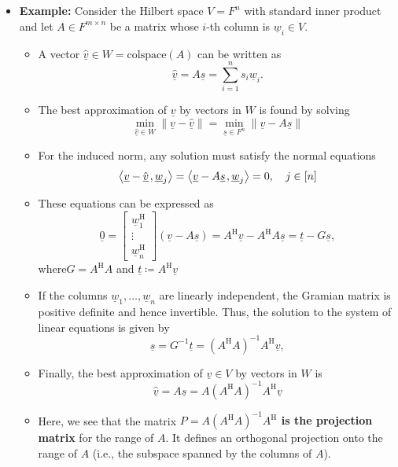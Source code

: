 \documentclass[11pt,twoside]{report}
\newcommand{\vecnot}{\underline}
\newcommand{\Herm}{{\mathrm{H}}}
\newcommand{\inner}[2]{{\left\langle #1 \mskip2mu , #2 \right\rangle}}
\begin{document}
\begin{itemize}
 
\item \textbf{Example:} Consider the Hilbert space $V = F^n$ with standard inner product and let  $A \in F^{m \times n}$ be a matrix whose $i$-th column is $\vecnot{w}_i \in V$.

\begin{itemize}
\item 
A vector  $\hat{\vecnot{v}} \in W = \text{colspace}(A)$ can be written as 
\[ \hat{\vecnot{v}} = A \vecnot{s} = \sum_{i=1}^n s_i \vecnot{w}_i.
\]

\item The best approximation of $\vecnot{v}$ by vectors in $W$ is found by solving
\[ \min_{\hat{\vecnot{v}}\in W} \| \vecnot{v} - \hat{ \vecnot{v}} \| = \min_{\vecnot{s} \in F^n} \| \vecnot{v} - A \vecnot{s} \|  \]

\item 
For the induced norm, any solution must satisfy the normal equations
\[ \inner{ \vecnot{v} - \hat{\vecnot{v}} }{ \vecnot{w}_j }
= \inner{ \vecnot{v} - A \vecnot{s} }{ \vecnot{w}_j }
= 0, \quad j \in [n]
\]



\item These equations can be expressed as
\begin{equation*}
\vecnot{0} = \left[ \begin{array}{c} \vecnot{w}_1^\Herm \\ \vdots \\ \vecnot{w}_n^\Herm \end{array} \right] \left( \vecnot{v} - A \vecnot{s} \right) = A^\Herm \vecnot{v} - A^\Herm A \vecnot{s} = \vecnot{t} - G \vecnot{s},
\end{equation*}
where$G = A^\Herm A$ and  $\vecnot{t} \coloneqq  A^\Herm \vecnot{v}$ %


\item If the columns  $\vecnot{w}_1, \ldots, \vecnot{w}_n$ are linearly independent, the Gramian matrix is positive definite and hence invertible.
Thus, the solution to the system of linear equations is given by %
\begin{equation*}
\vecnot{s} = G^{-1} \vecnot{t} = \left( A^\Herm A \right)^{-1} A^\Herm \vecnot{v},
\end{equation*}

\item Finally, the best approximation of $\vecnot{v} \in V$ by vectors in $W$ is 
\begin{equation*}
\hat{\vecnot{v}} = A \vecnot{s} = A \left( A^\Herm A \right)^{-1} A^\Herm \vecnot{v} 
\end{equation*}
\item Here, we see that the matrix \textbf{$P = A \left( A^\Herm A \right)^{-1} A^\Herm$ is the projection matrix} for the range of $A$. It defines an orthogonal projection onto the range of $A$ (i.e., the subspace spanned by the columns of $A$).



\end{itemize}
\end{itemize}
\end{document}
